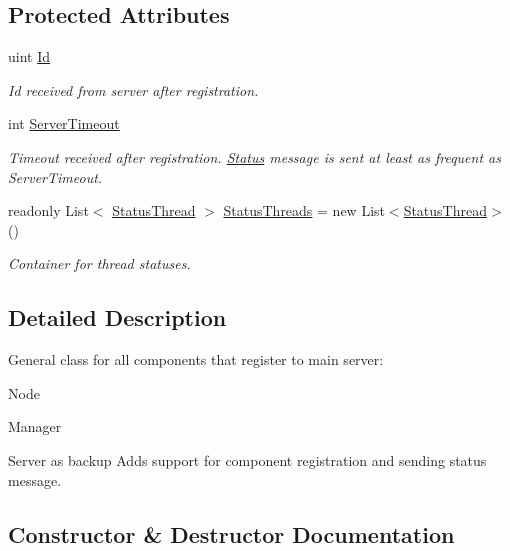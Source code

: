 \subsection*{Protected Attributes}
\begin{DoxyCompactItemize}
\item 
uint \hyperlink{class_cluster_utils_1_1_registered_component_a0d238d34c162300a2aa7a3caf34689eb}{Id}
\begin{DoxyCompactList}\small\item\em Id received from server after registration. \end{DoxyCompactList}\item 
int \hyperlink{class_cluster_utils_1_1_registered_component_ac95b4af9a774f273a235e31215d6e7bc}{Server\+Timeout}
\begin{DoxyCompactList}\small\item\em Timeout received after registration. \hyperlink{class_status}{Status} message is sent at least as frequent as Server\+Timeout. \end{DoxyCompactList}\item 
readonly List$<$ \hyperlink{class_status_thread}{Status\+Thread} $>$ \hyperlink{class_cluster_utils_1_1_registered_component_a19bb76d070f24ca944bab753b1409b03}{Status\+Threads} = new List$<$\hyperlink{class_status_thread}{Status\+Thread}$>$()
\begin{DoxyCompactList}\small\item\em Container for thread statuses. \end{DoxyCompactList}\end{DoxyCompactItemize}


\subsection{Detailed Description}
General class for all components that register to main server\+: 


\begin{DoxyItemize}
\item Node
\item Manager
\item Server as backup Adds support for component registration and sending status message. 
\end{DoxyItemize}

\subsection{Constructor \& Destructor Documentation}
\hypertarget{class_cluster_utils_1_1_registered_component_a83b5d230bde822e0fb192b51ebbd2fbc}{}
